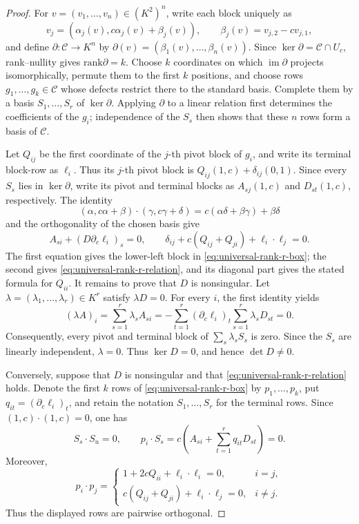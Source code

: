 \documentclass[12pt]{article}
\newcommand{\rank}{\mathrm{rank}}
\begin{document}
\begin{proof}
For \(v=(v_1,\ldots,v_n)\in(K^2)^n\), write each block uniquely as
\[
 v_j=(\alpha_j(v),c\alpha_j(v)+\beta_j(v)),\qquad
 \beta_j(v)=v_{j,2}-cv_{j,1},
\]
and define \(\partial:\mathcal C\to K^n\) by
\(\partial(v)=(\beta_1(v),\ldots,\beta_n(v))\).  Since
\(\ker\partial=\mathcal C\cap U_c\), rank--nullity gives
\(\rank\partial=k\).  Choose \(k\) coordinates on which
\(\operatorname{im}\partial\) projects isomorphically, permute them to the
first \(k\) positions, and choose rows \(g_1,\ldots,g_k\in\mathcal C\) whose defects
restrict there to the standard basis.  Complete them by a basis
\(S_1,\ldots,S_r\) of \(\ker\partial\).  Applying \(\partial\) to a linear
relation first determines the coefficients of the \(g_i\); independence of
the \(S_s\) then shows that these \(n\) rows form a basis of \(\mathcal C\).

Let \(Q_{ij}\) be the first coordinate of the \(j\)-th pivot block of
\(g_i\), and write its terminal block-row as \(\ell_i\).  Thus its
\(j\)-th pivot block is
\(Q_{ij}(1,c)+\delta_{ij}(0,1)\).  Since every \(S_s\) lies in
\(\ker\partial\), write its pivot and terminal blocks as
\(A_{sj}(1,c)\) and \(D_{st}(1,c)\), respectively.  The identity
\[
 (\alpha,c\alpha+\beta)\cdot(\gamma,c\gamma+\delta)
   =c(\alpha\delta+\beta\gamma)+\beta\delta
\]
and the orthogonality of the chosen basis give
\[
 A_{si}+(D\partial_c\ell_i)_s=0,
\qquad
 \delta_{ij}+c(Q_{ij}+Q_{ji})+\ell_i\cdot\ell_j=0.
\]
The first equation gives the lower-left block in
\eqref{eq:universal-rank-r-box}; the second gives
\eqref{eq:universal-rank-r-relation}, and its diagonal part gives the stated
formula for \(Q_{ii}\).  It remains to prove that \(D\) is nonsingular.
Let \(\lambda=(\lambda_1,\ldots,\lambda_r)\in K^r\) satisfy
\(\lambda D=0\).  For every \(i\), the first identity yields
\[
 (\lambda A)_i
   =\sum_{s=1}^r\lambda_sA_{si}
   =-\sum_{t=1}^r(\partial_c\ell_i)_t
                    \sum_{s=1}^r\lambda_sD_{st}=0.
\]
Consequently, every pivot and terminal block of
\(\sum_s\lambda_sS_s\) is zero.  Since the \(S_s\) are linearly
independent, \(\lambda=0\).  Thus \(\ker D=0\), and hence
\(\det D\ne0\).

Conversely, suppose that \(D\) is nonsingular and that
\eqref{eq:universal-rank-r-relation} holds.  Denote the first \(k\) rows of
\eqref{eq:universal-rank-r-box} by \(p_1,\ldots,p_k\), put
\(q_{it}=(\partial_c\ell_i)_t\), and retain the notation
\(S_1,\ldots,S_r\) for the terminal rows.  Since
\((1,c)\cdot(1,c)=0\), one has
\[
 S_s\cdot S_u=0,
 \qquad
 p_i\cdot S_s
   =c\left(A_{si}+\sum_{t=1}^r q_{it}D_{st}\right)=0.
\]
Moreover,
\[
 p_i\cdot p_j=
 \begin{cases}
  1+2cQ_{ii}+\ell_i\cdot\ell_i=0,&i=j,\\
  c(Q_{ij}+Q_{ji})+\ell_i\cdot\ell_j=0,&i\ne j.
 \end{cases}
\]
Thus the displayed rows are pairwise orthogonal.


\end{proof}
\end{document}
